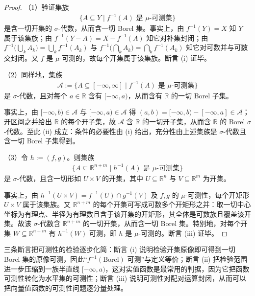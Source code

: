 \documentclass[../../main.tex]{subfiles}
\begin{document}
\begin{proof}
（1）验证集族
\begin{align*}
\{A\subseteq Y\mid f^{-1}(A)\text{ 是 }\mu\text{-可测集}\}
\end{align*}
是含一切开集的 $\sigma$-代数，从而含一切 Borel 集。事实上，由 $f^{-1}(Y)=X$ 知 $Y$ 属于该集族；由 $f^{-1}(Y-A)=X-f^{-1}(A)$ 知它对补集封闭；由 $f^{-1}\bigl(\bigcup_{k}A_{k}\bigr)=\bigcup_{k}f^{-1}(A_{k})$ 与 $f^{-1}\bigl(\bigcap_{k}A_{k}\bigr)=\bigcap_{k}f^{-1}(A_{k})$ 知它对可数并与可数交封闭。又 $f$ 是 $\mu$-可测的，故每个开集属于该集族。断言 (i) 证毕。

（2）同样地，集族
\begin{align*}
\mathcal{A}:=\{A\subseteq[-\infty,\infty]\mid f^{-1}(A)\text{ 是 }\mu\text{-可测集}\}
\end{align*}
是 $\sigma$-代数，且对每个 $a\in\mathbb{R}$ 含有 $[-\infty,a)$，从而含有 $\mathbb{R}$ 的一切 Borel 子集。

事实上，由 $[-\infty,b)\in\mathcal{A}$ 与 $[-\infty,a)\in\mathcal{A}$ 得 $(a,b)=[-\infty,b)-[-\infty,a]\in\mathcal{A}$；开区间之并给出 $\mathbb{R}$ 的每个开子集，故 $\mathcal{A}$ 含 $\mathbb{R}$ 的一切开子集，从而含 $\mathbb{R}$ 的 Borel $\sigma$-代数。至此 (ii) 成立：条件的必要性由 (i) 给出，充分性由上述集族是 $\sigma$-代数且含一切 Borel 子集得到。

（3）令 $h:=(f,g)$。则集族
\begin{align*}
\{A\subseteq\mathbb{R}^{n+m}\mid h^{-1}(A)\text{ 是 }\mu\text{-可测集}\}
\end{align*}
是 $\sigma$-代数，且含一切形如 $U\times V$ 的开集，其中 $U\subseteq\mathbb{R}^{n}$ 与 $V\subseteq\mathbb{R}^{m}$ 为开集。

事实上，由 $h^{-1}(U\times V)=f^{-1}(U)\cap g^{-1}(V)$ 及 $f,g$ 的 $\mu$-可测性，每个开矩形 $U\times V$ 属于该集族。又 $\mathbb{R}^{n+m}$ 的每个开集可写成可数多个开矩形之并：取一切中心坐标为有理点、半径为有理数且含于该开集的开矩形，其全体是可数族且覆盖该开集。故该 $\sigma$-代数含 $\mathbb{R}^{n+m}$ 的一切开集，从而含一切 Borel 集。特别地，对每个开集 $W\subseteq\mathbb{R}^{n+m}$ 有 $h^{-1}(W)$ 可测，即 $h$ 是 $\mu$-可测的。断言 (iii) 证毕。
\end{proof}

\begin{remark}\label{remark:ch01-thm-1-10-动机}
三条断言把可测性的检验逐步化简：断言 (i) 说明检验开集原像即可得到一切 Borel 集的原像可测，因此“$f^{-1}(\text{Borel})$ 可测”与定义等价；断言 (ii) 把检验范围进一步压缩到一族半直线 $[-\infty,a)$，这对实值函数是最常用的判据，因为它把函数可测性转化为水平集的可测性；断言 (iii) 说明可测性对配对运算封闭，从而可以把向量值函数的可测性问题逐分量处理。
\end{remark}
\end{document}
